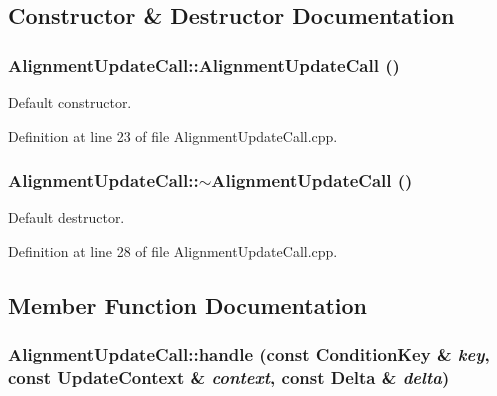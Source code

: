 \subsection{Constructor \& Destructor Documentation}
\hypertarget{class_d_d4hep_1_1_alignments_1_1_alignment_update_call_ad19c943603062f89569a8341b139025f}{
\subsubsection[{AlignmentUpdateCall}]{\setlength{\rightskip}{0pt plus 5cm}AlignmentUpdateCall::AlignmentUpdateCall ()}}
\label{class_d_d4hep_1_1_alignments_1_1_alignment_update_call_ad19c943603062f89569a8341b139025f}


Default constructor. 

Definition at line 23 of file AlignmentUpdateCall.cpp.\hypertarget{class_d_d4hep_1_1_alignments_1_1_alignment_update_call_a63a0be9ac654016954dcb1405954ac95}{
\subsubsection[{$\sim$AlignmentUpdateCall}]{\setlength{\rightskip}{0pt plus 5cm}AlignmentUpdateCall::$\sim$AlignmentUpdateCall ()}}
\label{class_d_d4hep_1_1_alignments_1_1_alignment_update_call_a63a0be9ac654016954dcb1405954ac95}


Default destructor. 

Definition at line 28 of file AlignmentUpdateCall.cpp.

\subsection{Member Function Documentation}
\hypertarget{class_d_d4hep_1_1_alignments_1_1_alignment_update_call_a5f99eaf1be2d8307eb53f54d570a5ab6}{
\subsubsection[{handle}]{ AlignmentUpdateCall::handle (const {\bf ConditionKey} \& {\em key}, \/  const {\bf UpdateContext} \& {\em context}, \/  const {\bf Delta} \& {\em delta})}}
\label{class_d_d4hep_1_1_alignments_1_1_alignment_update_call_a5f99eaf1be2d8307eb53f54d570a5ab6}


